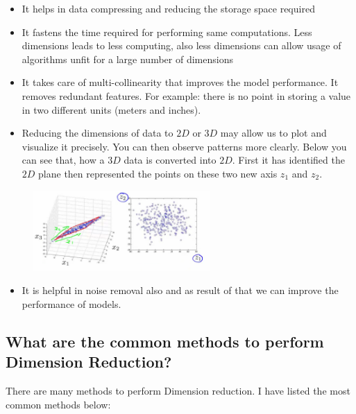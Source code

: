 \documentclass[12pt]{article}
\theoremstyle{plain}
\begin{document}
\begin{itemize}
\item It helps in data compressing and reducing the storage space required
\item It fastens the time required for performing same computations. Less dimensions leads to less computing, also less dimensions can allow usage of algorithms unfit for a large number of dimensions
\item It takes care of multi-collinearity that improves the model performance. It removes redundant features. For example: there is no point in storing a value in two different units (meters and inches).
\item Reducing the dimensions of data to $2D$ or $3D$ may allow us to plot and visualize it precisely. You can then observe patterns more clearly. Below you can see that, how a $3D$ data is converted into $2D$. First it has identified the $2D$ plane then represented the points on these two new axis $z_1$ and $z_2$.
\end{itemize}

\begin{figure}[H]
 \begin{center}
  \includegraphics[width=0.6\textwidth]{media/Image-4.png}

 \end{center}
\end{figure}

\begin{itemize}
\item It is helpful in noise removal also and as result of that we can improve the performance of models.
\end{itemize}

\subsection{What are the common methods to perform Dimension Reduction?}

There are many methods to perform Dimension reduction. I have listed the most common methods below:
\end{document}
